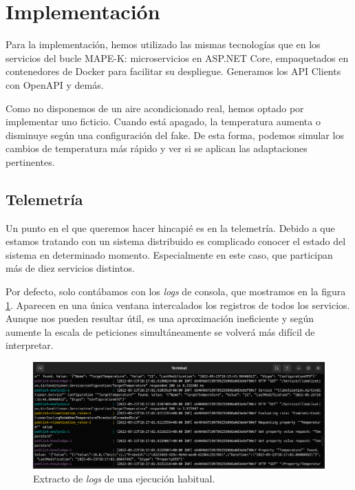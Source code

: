 \section{Implementación}

Para la implementación, hemos utilizado las mismas tecnologías que en los servicios del bucle MAPE-K: microservicios en ASP.NET Core, empaquetados en contenedores de Docker para facilitar su despliegue. Generamos los API Clients con OpenAPI y demás.

Como no disponemos de un aire acondicionado real, hemos optado por implementar uno ficticio. Cuando está apagado, la temperatura aumenta o disminuye según una configuración del fake. De esta forma, podemos simular los cambios de temperatura más rápido y ver si se aplican las adaptaciones pertinentes.

\subsection{Telemetría}

Un punto en el que queremos hacer hincapié es en la telemetría. Debido a que estamos tratando con un sistema distribuido es complicado conocer el estado del sistema en determinado momento. Especialmente en este caso, que participan más de diez servicios distintos.

Por defecto, solo contábamos con los \emph{logs} de consola, que mostramos en la figura \ref{fig:console-logs}. Aparecen en una única ventana intercalados los registros de todos los servicios. Aunque nos pueden resultar útil, es una aproximación ineficiente y según aumente la escala de peticiones simultáneamente se volverá más difícil de interpretar.

\begin{figure}[h]
  \centering
  \includegraphics[scale=1.45]{04_caso-estudio/images/console-logs}
  \caption{Extracto de \emph{logs} de una ejecución habitual.}
  \label{fig:console-logs}
\end{figure}

